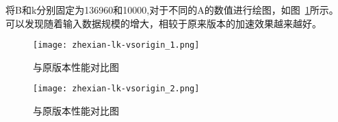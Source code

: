 将B和k分别固定为136960和10000,对于不同的A的数值进行绘图，如图~\ref{fig:bench_littlek-vsorigin}所示。
可以发现随着输入数据规模的增大，相较于原来版本的加速效果越来越好。
    \begin{figure}[ht]
        \centering
        \texttt{[image: zhexian-lk-vsorigin\_1.png]}
        \caption{与原版本性能对比图}
        \label{fig:bench_littlek-vsorigin}
    \end{figure}
    

    \begin{figure}[ht]
        \centering
        \texttt{[image: zhexian-lk-vsorigin\_2.png]}
        \caption{与原版本性能对比图}
        \label{fig:bench_littlek-vsorigin_1}
    \end{figure}
    

